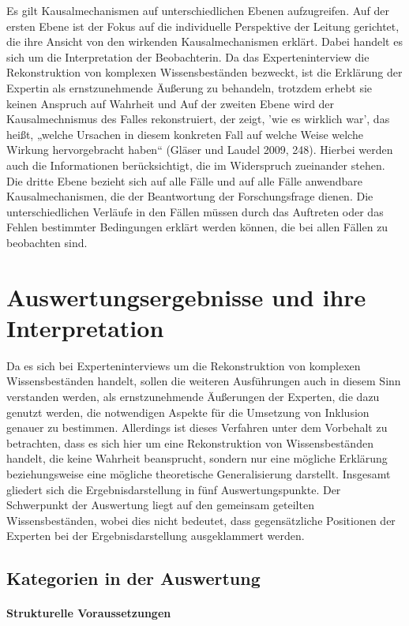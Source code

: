 Es gilt Kausalmechanismen auf unterschiedlichen Ebenen aufzugreifen.
Auf der ersten Ebene ist der Fokus auf die individuelle Perspektive der Leitung gerichtet, die ihre Ansicht von den wirkenden Kausalmechanismen erklärt. Dabei handelt es sich um die Interpretation der Beobachterin. Da das Experteninterview die Rekonstruktion von komplexen Wissensbeständen bezweckt, ist die Erklärung der Expertin als  ernstzunehmende Äußerung zu behandeln, trotzdem erhebt sie keinen Anspruch auf Wahrheit und 
Auf der zweiten Ebene wird der Kausalmechnismus des Falles rekonstruiert, der zeigt, 'wie es wirklich war', das heißt, „welche Ursachen in diesem konkreten Fall auf welche Weise welche Wirkung hervorgebracht haben“ (Gläser und Laudel 2009, 248). Hierbei werden auch die Informationen berücksichtigt, die im Widerspruch zueinander stehen.
Die dritte Ebene bezieht sich auf alle Fälle und auf alle Fälle anwendbare Kausalmechanismen, die der Beantwortung der Forschungsfrage dienen. Die unterschiedlichen Verläufe in den Fällen müssen durch das Auftreten oder das Fehlen bestimmter Bedingungen erklärt werden können, die bei allen Fällen zu beobachten sind. 

\section{Auswertungsergebnisse und ihre Interpretation}
Da es sich bei Experteninterviews um die Rekonstruktion von komplexen Wissensbeständen handelt, sollen die weiteren Ausführungen auch in diesem Sinn verstanden werden, als
ernstzunehmende Äußerungen der Experten, die dazu genutzt werden, die notwendigen Aspekte für die Umsetzung von Inklusion genauer zu bestimmen. Allerdings ist dieses Verfahren unter dem Vorbehalt zu betrachten, dass es sich hier um eine Rekonstruktion von
Wissensbeständen handelt, die keine Wahrheit beansprucht, sondern nur eine mögliche
Erklärung beziehungsweise eine mögliche theoretische Generalisierung darstellt.
Insgesamt gliedert sich die Ergebnisdarstellung in fünf Auswertungspunkte. 
Der Schwerpunkt der Auswertung liegt auf den gemeinsam geteilten Wissensbeständen, wobei dies nicht
bedeutet, dass gegensätzliche Positionen der Experten bei der Ergebnisdarstellung ausgeklammert werden.
 
\subsection{Kategorien in der Auswertung}
\paragraph{Strukturelle Voraussetzungen}

